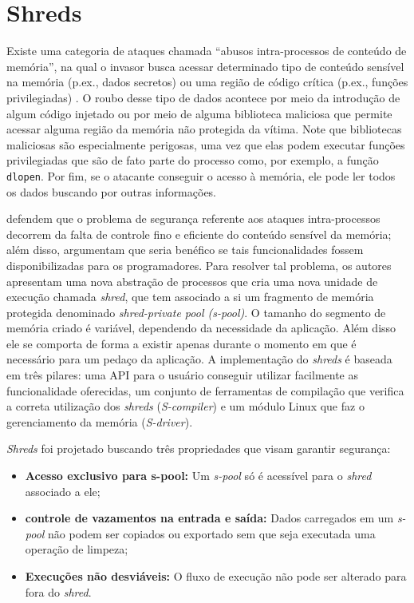 \section{Shreds}

Existe uma categoria de ataques chamada ``abusos intra-processos de conteúdo
de memória'', na qual o invasor busca acessar determinado tipo de conteúdo
sensível na memória (p.ex., dados secretos) ou uma região de código crítica
(p.ex., funções privilegiadas) \citep{shreds}. O roubo desse tipo de dados
acontece por meio da introdução de algum código injetado ou por meio de alguma
biblioteca maliciosa que permite acessar alguma região da memória não protegida
da vítima. Note que bibliotecas maliciosas são especialmente perigosas, uma vez
que elas podem executar funções privilegiadas que são de fato parte do
processo como, por exemplo, a função \texttt{dlopen}. Por fim, se o atacante
conseguir o acesso à memória, ele pode ler todos os dados buscando por outras
informações.

\citet{shreds} defendem que o problema de segurança referente aos ataques
intra-processos decorrem da falta de controle fino e eficiente do conteúdo
sensível da memória; além disso, argumentam que seria benéfico se tais
funcionalidades fossem disponibilizadas para os programadores. Para resolver tal
problema, os autores apresentam uma nova abstração de processos que cria uma
nova unidade de execução chamada \emph{shred}, que tem associado a si um
fragmento de memória protegida denominado \emph{shred-private pool
(s-pool)}. O tamanho do segmento de memória criado é variável,
dependendo da necessidade da aplicação. Além disso ele se comporta de forma a
existir apenas durante o momento em que é necessário para um pedaço da
aplicação. A implementação do \emph{shreds} é baseada em três pilares: uma API
para o usuário conseguir utilizar facilmente as funcionalidade oferecidas, um
conjunto de ferramentas de compilação que verifica a correta utilização dos
\emph{shreds} (\emph{S-compiler}) e um módulo Linux que faz o gerenciamento da
memória (\emph{S-driver}).

\emph{Shreds} foi projetado buscando três propriedades que visam garantir
segurança:

\begin{itemize}
  \item \textbf{Acesso exclusivo para s-pool:} Um \emph{s-pool} só é acessível
        para o \emph{shred} associado a ele;
  \item \textbf{controle de vazamentos na entrada e saída:} Dados carregados em um
        \emph{s-pool} não podem ser copiados ou exportado sem que seja
        executada uma operação de limpeza;
  \item \textbf{Execuções não desviáveis:} O fluxo de execução não pode ser
        alterado para fora do \emph{shred}.
\end{itemize}

